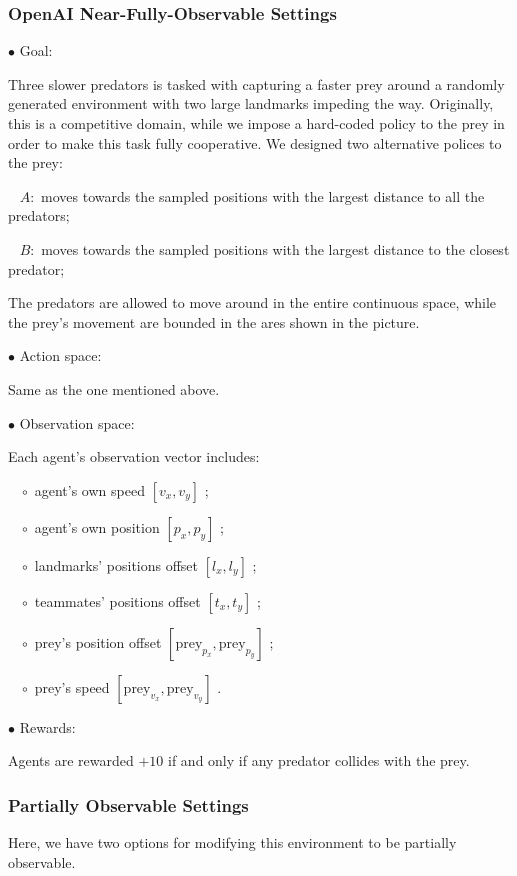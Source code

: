 \documentclass{article}
\begin{document}
\subsubsection{OpenAI Near-Fully-Observable Settings}

$\bullet$ Goal:  

Three slower predators is tasked with capturing a faster prey around a randomly generated environment with two large landmarks impeding the way. Originally, this is a competitive domain, while we impose a hard-coded policy to the prey in order to make this task fully cooperative. We designed two alternative polices to the prey: 

$\,\,\,\,\,A:$ moves towards the sampled positions with the largest distance to all the predators;

$\,\,\,\,\,B:$ moves towards the sampled positions with the largest distance to the closest predator;

The predators are allowed to move around in the entire continuous space, while the prey's movement are bounded in the ares shown in the picture.

$\bullet$ Action space: 

Same as the one mentioned above.

$\bullet$ Observation space: 

Each agent's observation vector includes:

$\,\,\,\,\,\circ$ agent's own speed $[v_x, v_y]$ ;

$\,\,\,\,\,\circ$ agent's own position $[p_x, p_y]$ ;

$\,\,\,\,\,\circ$ landmarks' positions offset $[l_x, l_y]$ ;

$\,\,\,\,\,\circ$ teammates' positions offset $[t_x, t_y]$ ;

$\,\,\,\,\,\circ$ prey's position offset $[\text{prey}_{p_x}, \text{prey}_{p_y}]$ ;

$\,\,\,\,\,\circ$ prey's speed $[\text{prey}_{v_x}, \text{prey}_{v_y}]$ .

$\bullet$ Rewards: 

Agents are rewarded $+10$ if and only if any predator collides with the prey.

\subsubsection{Partially Observable Settings}

Here, we have two options for modifying this environment to be partially observable.
\end{document}
